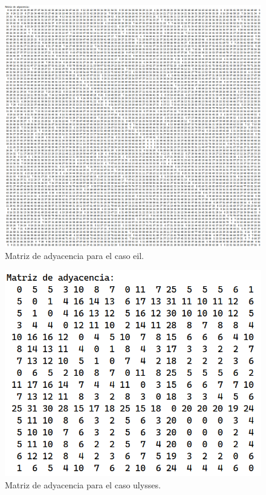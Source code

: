 \begin{figure}[H]
  \centering
  \includegraphics[scale=0.5]{img/ady-eil.png}
  \caption{Matriz de adyacencia para el caso eil.}
\end{figure}

\begin{figure}[H]
  \centering
  \includegraphics[scale=0.5]{img/ady-ulysses.png}
  \caption{Matriz de adyacencia para el caso ulysses.}
\end{figure}


